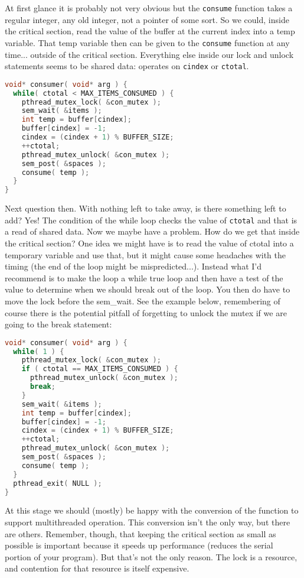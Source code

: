 At first glance it is probably not very obvious but the \texttt{consume} function takes a regular integer, any old integer, not a pointer of some sort. So we could, inside the critical section, read the value of the buffer at the current index into a temp variable. That temp variable then can be given to the \texttt{consume} function at any time... outside of the critical section. Everything else inside our lock and unlock statements seems to be shared data: operates on \texttt{cindex} or \texttt{ctotal}.

\begin{lstlisting}[language=C]
void* consumer( void* arg ) { 
  while( ctotal < MAX_ITEMS_CONSUMED ) {
    pthread_mutex_lock( &con_mutex );
    sem_wait( &items );
    int temp = buffer[cindex];
    buffer[cindex] = -1;
    cindex = (cindex + 1) % BUFFER_SIZE;
    ++ctotal;
    pthread_mutex_unlock( &con_mutex );
    sem_post( &spaces );
    consume( temp );
  }
}
\end{lstlisting}

Next question then. With nothing left to take away, is there something left to add? Yes! The condition of the while loop checks the value of \texttt{ctotal} and that is a read of shared data. Now we maybe have a problem. How do we get that inside the critical section? One idea we might have is to read the value of ctotal into a temporary variable and use that, but it might cause some headaches with the timing (the end of the loop might be mispredicted...).  Instead what I'd recommend is to make the loop a while true loop and then have a test of the value to determine when we should break out of the loop. You then do have to move the lock before the sem\_wait. See the example below, remembering of course there is the potential pitfall of forgetting to unlock the mutex if we are going to the break statement:

\begin{lstlisting}[language=C]
void* consumer( void* arg ) { 
  while( 1 ) { 
    pthread_mutex_lock( &con_mutex );  
    if ( ctotal == MAX_ITEMS_CONSUMED ) {
      pthread_mutex_unlock( &con_mutex );
      break;
    }   
    sem_wait( &items );
    int temp = buffer[cindex];
    buffer[cindex] = -1; 
    cindex = (cindex + 1) % BUFFER_SIZE;
    ++ctotal;
    pthread_mutex_unlock( &con_mutex );
    sem_post( &spaces );
    consume( temp );
  }
  pthread_exit( NULL );
}
\end{lstlisting}

At this stage we should (mostly) be happy with the conversion of the function to support multithreaded operation. This conversion isn't the only way, but there are others. Remember, though, that keeping the critical section as small as possible is important because it speeds up performance (reduces the serial portion of your program). But that's not the only reason. The lock is a resource, and contention for that resource is itself expensive.

